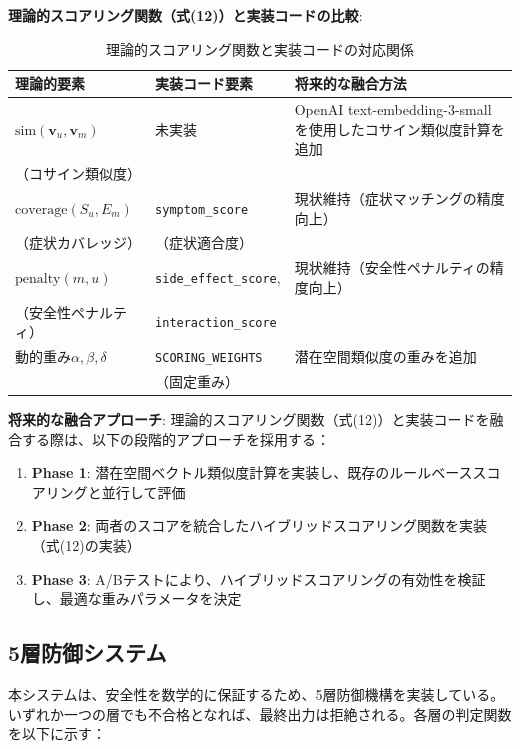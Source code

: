 \documentclass[a4paper,11pt,ja=standard,xelatex]{bxjsarticle}
\theoremstyle{definition}
\begin{document}
\textbf{理論的スコアリング関数（式(12)）と実装コードの比較}:

\begin{table}[!htbp]
\centering
\caption{理論的スコアリング関数と実装コードの対応関係}
\begin{tabular}{|l|l|l|}
\hline
\textbf{理論的要素} & \textbf{実装コード要素} & \textbf{将来的な融合方法} \\
\hline
$\text{sim}(\mathbf{v}_u, \mathbf{v}_m)$ & 未実装 & OpenAI text-embedding-3-smallを使用したコサイン類似度計算を追加 \\
（コサイン類似度） & & \\
\hline
$\text{coverage}(S_u, E_m)$ & \texttt{symptom\_score} & 現状維持（症状マッチングの精度向上） \\
（症状カバレッジ） & （症状適合度） & \\
\hline
$\text{penalty}(m, u)$ & \texttt{side\_effect\_score}, & 現状維持（安全性ペナルティの精度向上） \\
（安全性ペナルティ） & \texttt{interaction\_score} & \\
\hline
動的重み$\alpha, \beta, \delta$ & \texttt{SCORING\_WEIGHTS} & 潜在空間類似度の重みを追加 \\
& （固定重み） & \\
\hline
\end{tabular}
\end{table}

\textbf{将来的な融合アプローチ}: 理論的スコアリング関数（式(12)）と実装コードを融合する際は、以下の段階的アプローチを採用する：
\begin{enumerate}
\item \textbf{Phase 1}: 潜在空間ベクトル類似度計算を実装し、既存のルールベーススコアリングと並行して評価
\item \textbf{Phase 2}: 両者のスコアを統合したハイブリッドスコアリング関数を実装（式(12)の実装）
\item \textbf{Phase 3}: A/Bテストにより、ハイブリッドスコアリングの有効性を検証し、最適な重みパラメータを決定
\end{enumerate}

\subsection{5層防御システム}

本システムは、安全性を数学的に保証するため、5層防御機構を実装している。いずれか一つの層でも不合格となれば、最終出力は拒絶される。各層の判定関数を以下に示す：
\end{document}
